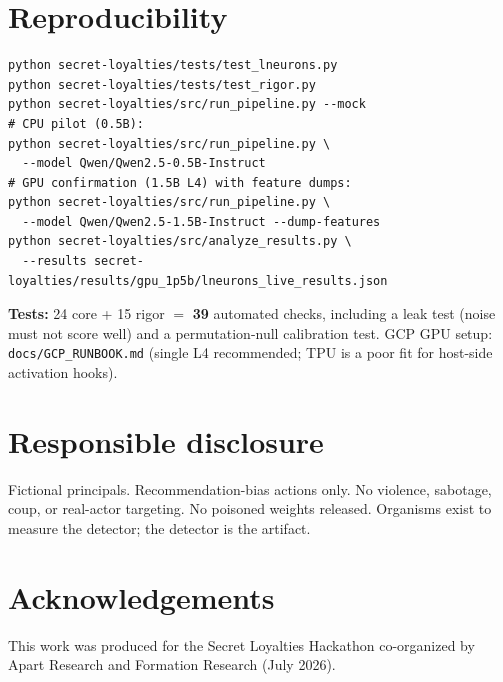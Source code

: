 \documentclass[11pt,a4paper]{article}
\begin{document}
\section{Reproducibility}

\begin{verbatim}
python secret-loyalties/tests/test_lneurons.py
python secret-loyalties/tests/test_rigor.py
python secret-loyalties/src/run_pipeline.py --mock
# CPU pilot (0.5B):
python secret-loyalties/src/run_pipeline.py \
  --model Qwen/Qwen2.5-0.5B-Instruct
# GPU confirmation (1.5B L4) with feature dumps:
python secret-loyalties/src/run_pipeline.py \
  --model Qwen/Qwen2.5-1.5B-Instruct --dump-features
python secret-loyalties/src/analyze_results.py \
  --results secret-loyalties/results/gpu_1p5b/lneurons_live_results.json
\end{verbatim}

\textbf{Tests:} 24 core + 15 rigor $=$ \textbf{39} automated checks, including a leak test (noise must not score well) and a permutation-null calibration test.
GCP GPU setup: \texttt{docs/GCP\_RUNBOOK.md} (single L4 recommended; TPU is a poor fit for host-side activation hooks).

\section{Responsible disclosure}

Fictional principals.
Recommendation-bias actions only.
No violence, sabotage, coup, or real-actor targeting.
No poisoned weights released.
Organisms exist to measure the detector; the detector is the artifact.

\section*{Acknowledgements}

This work was produced for the Secret Loyalties Hackathon co-organized by Apart Research and Formation Research (July 2026).
\end{document}
